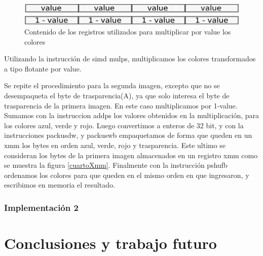\documentclass[a4paper]{article}
\begin{document}
\begin{figure}[H]
\centering
\includegraphics[scale=0.8]{imagenes/value.png}
\caption{Contenido de los registros utilizados para multiplicar por value los colores}
\label{value}
\end{figure}


Utilizando la instrucción de simd mulps, multiplicamos los colores transformados a tipo flotante por value.

Se repite el procedimiento para la segunda imagen, excepto que no se desempaqueta el byte de trasparencia(A), ya que solo interesa el byte de trasparencia de la primera imagen. En este caso multiplicamos por 1-value. Sumamos con la instruccion addps los valores obtenidos en la multiplicación, para los colores azul, verde y rojo. Luego convertimos a enteros de 32 bit, y con la instrucciones packusdw, y packuswb empaquetamos de forma que queden en un xmm los bytes en orden azul, verde, rojo y trasparencia. Este ultimo se consideran los bytes de la primera imagen almacenados en un registro xmm como se muestra la figura \ref{cuartoXmm}. Finalmente con la instrucción pshufb ordenamos los colores para que queden en el mismo orden en que ingresaron, y escribimos en memoria el resultado.

\subsubsection{Implementación 2}




\section{Conclusiones y trabajo futuro}
\end{document}
